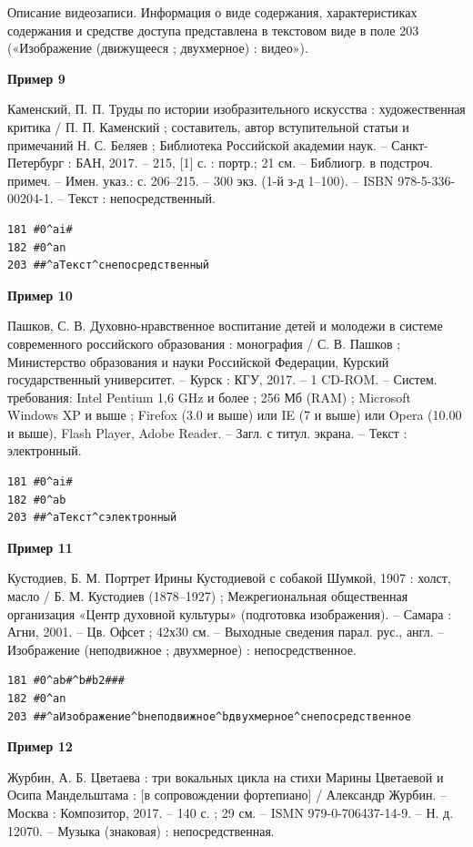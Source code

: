 Описание видеозаписи. Информация о виде содержания, характеристиках содержания и средстве доступа представлена в текстовом виде в поле 203 («Изображение (движущееся ; двухмерное) : видео»).

\textbf{Пример 9}

Каменский, П. П. Труды по истории изобразительного искусства : художественная критика / П. П. Каменский ; составитель, автор вступительной статьи и примечаний Н. С. Беляев ; Библиотека Российской академии наук. – Санкт-Петербург : БАН, 2017. – 215, [1] с. : портр.; 21 см. – Библиогр. в подстроч. примеч. – Имен. указ.: с. 206–215. – 300 экз. (1-й з-д 1–100). – ISBN 978-5-336-00204-1. – Текст : непосредственный.

\begin{verbatim}
181 #0^ai#
182 #0^an
203 ##^aТекст^cнепосредственный
\end{verbatim}

\textbf{Пример 10}

Пашков, С. В. Духовно-нравственное воспитание детей и молодежи в системе современного российского образования : монография / С. В. Пашков ; Министерство образования и науки Российской Федерации, Курский государственный университет. – Курск : КГУ, 2017. – 1 CD-ROM. – Систем. требования: Intel Pentium 1,6 GHz и более ; 256 Мб (RAM) ; Microsoft Windows XP и выше ; Firefox (3.0 и выше) или IE (7 и выше) или Opera (10.00 и выше), Flash Player, Adobe Reader. – Загл. с титул. экрана. – Текст : электронный.

\begin{verbatim}
181 #0^ai#
182 #0^ab
203 ##^aТекст^cэлектронный
\end{verbatim}

\textbf{Пример 11}

Кустодиев, Б. М. Портрет Ирины Кустодиевой с собакой Шумкой, 1907 : холст, масло / Б. М. Кустодиев (1878–1927) ; Межрегиональная общественная организация «Центр духовной культуры» (подготовка изображения). – Самара : Агни, 2001. – Цв. Офсет ; 42х30 см. – Выходные сведения парал. рус., англ. – Изображение (неподвижное ; двухмерное) : непосредственное.

\begin{verbatim}
181 #0^ab#^b#b2###
182 #0^an
203 ##^aИзображение^bнеподвижное^bдвухмерное^cнепосредственное
\end{verbatim}

\textbf{Пример 12}

Журбин, А. Б. Цветаева : три вокальных цикла на стихи Марины Цветаевой и Осипа Мандельштама : [в сопровождении фортепиано] / Александр Журбин. – Москва : Композитор, 2017. – 140 с. ; 29 см. – ISMN 979-0-706437-14-9. – Н. д. 12070. – Музыка (знаковая) : непосредственная.


